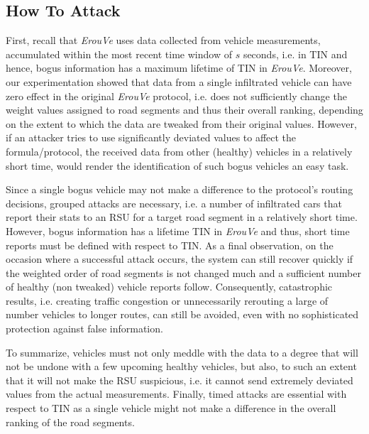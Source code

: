 \documentclass[conference]{IEEEtran}
\begin{document}
\subsection{How To Attack}
First, recall that {\it ErouVe} uses data collected from vehicle measurements, accumulated within the most recent time window of $s$ seconds,
i.e. in TIN and hence, bogus information has a maximum lifetime of TIN in {\it ErouVe}. Moreover, our experimentation showed that data from a 
single infiltrated vehicle can have zero effect in the original {\it ErouVe} protocol, i.e. does not sufficiently change the weight values assigned to road
segments and thus their overall ranking, depending on the extent to which the data are tweaked from their original values. However, if an attacker tries to use significantly
deviated values to affect the formula/protocol, the received data from other (healthy) vehicles in a relatively short time, would render the identification of such bogus vehicles an easy task.


Since a single bogus vehicle may not make a difference to the protocol's routing decisions, grouped attacks are necessary, i.e. a number of infiltrated cars that 
report their stats to an RSU for a target road segment in a relatively short time. However, bogus information has a lifetime
TIN in {\it ErouVe} and thus, short time reports must be defined with respect to TIN.  As a final observation, on the occasion 
where a successful attack occurs, the system can still recover quickly if the weighted order of road segments is not changed much and a sufficient number of healthy 
(non tweaked) vehicle reports follow. Consequently, catastrophic results, i.e. creating traffic congestion or unnecessarily rerouting a large of number vehicles to longer routes, 
can still be avoided, even with no sophisticated protection against false information.

To summarize, vehicles must not only meddle with the data to a degree that will not be undone with a few upcoming healthy vehicles, but also, to such an extent 
that it will not make the RSU suspicious, i.e. it cannot send extremely deviated values from the actual measurements. Finally, timed attacks are essential
with respect to TIN as a single vehicle might not make a difference in the overall ranking of the road segments.
\end{document}
